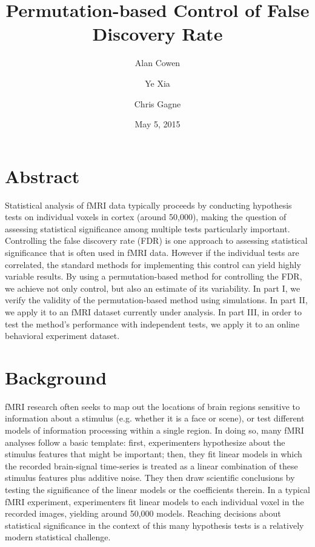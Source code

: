 \documentclass[11pt,notitlepage]{article}
\title{Permutation-based Control of False Discovery Rate}
\date{May 5, 2015}
\author{Alan Cowen \and Ye Xia \and Chris Gagne}
\begin{document}
\maketitle





\section*{Abstract}

Statistical analysis of fMRI data typically proceeds by conducting hypothesis tests on individual voxels in cortex (around 50,000), making the question of assessing statistical significance among multiple tests particularly important. Controlling the false discovery rate (FDR) is one approach to assessing statistical significance that is often used in fMRI data. However if the individual tests are correlated, the standard methods for implementing this control can yield highly variable results. By using a permutation-based method for controlling the FDR, we achieve not only control, but also an estimate of its variability. In part I, we verify the validity of the permutation-based method using simulations. In part II, we apply it to an fMRI dataset currently under analysis. In part III, in order to test the method's performance with independent tests, we apply it to an online behavioral experiment dataset.




\section*{Background}

fMRI research often seeks to map out the locations of brain regions sensitive to information about a stimulus (e.g. whether it is a face or scene), or test different models of information processing within a single region.  In doing so, many fMRI analyses follow a basic template: first, experimenters hypothesize about the stimulus features that might be important; then, they fit linear models in which the recorded brain-signal time-series is treated as a linear combination of these stimulus features plus additive noise. They then draw scientific conclusions by testing the significance of the linear models or the coefficients therein. In a typical fMRI experiment, experimenters fit linear models to each individual voxel in the recorded images, yielding around 50,000 models. Reaching decisions about statistical significance in the context of this many hypothesis tests is a relatively modern statistical challenge.
\end{document}
